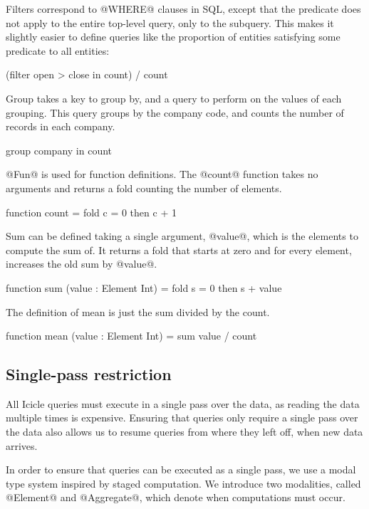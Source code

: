 Filters correspond to @WHERE@ clauses in SQL, except that the predicate does not apply to the entire top-level query, only to the subquery.
This makes it slightly easier to define queries like the proportion of entities satisfying some predicate to all entities: 
\begin{code}
(filter open > close in count) / count
\end{code}

Group takes a key to group by, and a query to perform on the values of each grouping.
This query groups by the company code, and counts the number of records in each company.
\begin{code}
group company in count
\end{code}

@Fun@ is used for function definitions.
The @count@ function takes no arguments and returns a fold counting the number of elements.
\begin{code}
function count
 = fold c = 0 then c + 1
\end{code}

Sum can be defined taking a single argument, @value@, which is the elements to compute the sum of.
It returns a fold that starts at zero and for every element, increases the old sum by @value@.
\begin{code}
function sum (value : Element Int)
 = fold s = 0 then s + value
\end{code}

The definition of mean is just the sum divided by the count.
\begin{code}
function mean (value : Element Int)
 = sum value / count
\end{code}




\subsection{Single-pass restriction}

All Icicle queries must execute in a single pass over the data, as reading the data multiple times is expensive. 
Ensuring that queries only require a single pass over the data also allows us to resume queries from where they left off, when new data arrives.

In order to ensure that queries can be executed as a single pass, we use a modal type system inspired by staged computation\cite{davies2001modal}.
We introduce two modalities, called @Element@ and @Aggregate@, which denote when computations must occur.

